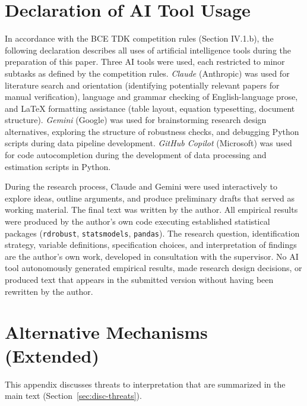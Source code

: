 \documentclass[12pt, a4paper]{report}
\begin{document}
\chapter{Declaration of AI Tool Usage}\label{app:ai-declaration}

In accordance with the BCE TDK competition rules (Section IV.1.b), the following declaration describes all uses of artificial intelligence tools during the preparation of this paper. Three AI tools were used, each restricted to minor subtasks as defined by the competition rules. \textit{Claude} (Anthropic) was used for literature search and orientation (identifying potentially relevant papers for manual verification), language and grammar checking of English-language prose, and LaTeX formatting assistance (table layout, equation typesetting, document structure). \textit{Gemini} (Google) was used for brainstorming research design alternatives, exploring the structure of robustness checks, and debugging Python scripts during data pipeline development. \textit{GitHub Copilot} (Microsoft) was used for code autocompletion during the development of data processing and estimation scripts in Python.

During the research process, Claude and Gemini were used interactively to explore ideas, outline arguments, and produce preliminary drafts that served as working material. The final text was written by the author. All empirical results were produced by the author's own code executing established statistical packages (\texttt{rdrobust}, \texttt{statsmodels}, \texttt{pandas}). The research question, identification strategy, variable definitions, specification choices, and interpretation of findings are the author's own work, developed in consultation with the supervisor. No AI tool autonomously generated empirical results, made research design decisions, or produced text that appears in the submitted version without having been rewritten by the author.

\chapter{Alternative Mechanisms (Extended)}\label{app:threats}

This appendix discusses threats to interpretation that are summarized in the main text (Section~\ref{sec:disc-threats}).
\end{document}

